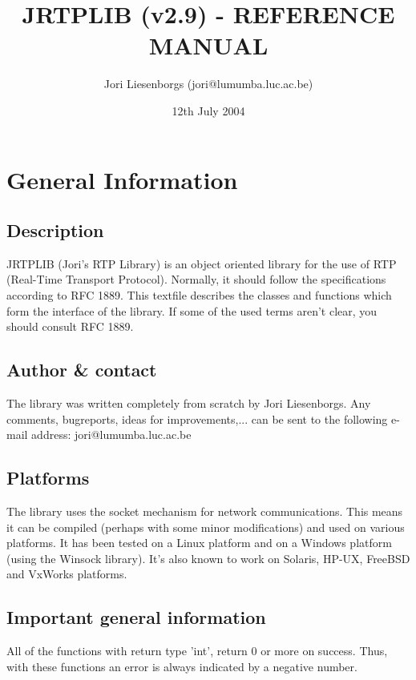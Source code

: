 

\title{JRTPLIB (v2.9) -  REFERENCE MANUAL}
\author{Jori Liesenborgs (jori@lumumba.luc.ac.be)}
\date{12th July 2004}
\maketitle


\section{General Information}

\subsection{Description}

JRTPLIB (Jori's RTP Library) is an object oriented library for the use of RTP
(Real-Time Transport Protocol). Normally, it should follow the specifications
according to RFC 1889. This textfile describes the classes and functions 
which form the interface of the library. If some of the used terms aren't
clear, you should consult RFC 1889.

\subsection{Author \& contact}

The library was written completely from scratch by Jori Liesenborgs. Any
comments, bugreports, ideas for improvements,... can be sent to the following
e-mail address:	
	jori@lumumba.luc.ac.be

\subsection{Platforms}

The library uses the socket mechanism for network communications. This means
it can be compiled (perhaps with some minor modifications) and used on 
various platforms. It has been tested on a Linux platform and on a Windows
platform (using the Winsock library). It's also known to work on Solaris,
HP-UX, FreeBSD and VxWorks platforms.

\subsection{Important general information}

All of the functions with return type 'int', return 0 or more on success. 
Thus, with these functions an error is always indicated by a negative number.

